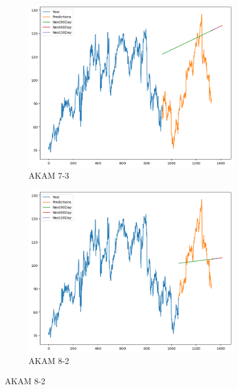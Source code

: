 \documentclass{ieeeojies}
\begin{document}
\begin{figure}[H]
    \centering
    \begin{subfigure}[h]{0.33\linewidth}
        \centering
        \includegraphics[width=\linewidth]{Linear Plot/AKAM_Linear Regression_7_3.png}
        \caption{AKAM 7-3}
        \label{fig:akam-7-3}
    \end{subfigure}%
    \hfill
    \begin{subfigure}[h]{0.33\linewidth}
        \centering
        \includegraphics[width=\linewidth]{Linear Plot/AKAM_Linear Regression_8_2.png}
        \caption{AKAM 8-2}
        \label{fig:akam-8-2}
    \end{subfigure}%

\end{figure}
\end{document}
